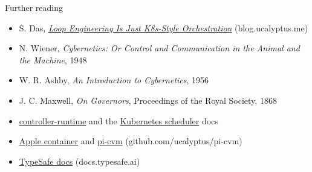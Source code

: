 \documentclass[aspectratio=169]{beamer}
\begin{document}
\begin{frame}{Further reading}
  \small
  \begin{itemize}
    \item S. Das, \href{https://blog.ucalyptus.me/p/loop-engineering-is-just-k8s-style}{\emph{Loop Engineering Is Just K8s-Style Orchestration}} (blog.ucalyptus.me)
    \item N. Wiener, \emph{Cybernetics: Or Control and Communication in the Animal and the Machine}, 1948
    \item W. R. Ashby, \emph{An Introduction to Cybernetics}, 1956
    \item J. C. Maxwell, \emph{On Governors}, Proceedings of the Royal Society, 1868
    \item \href{https://github.com/kubernetes-sigs/controller-runtime}{controller-runtime} and the \href{https://kubernetes.io/docs/concepts/scheduling-eviction/kube-scheduler/}{Kubernetes scheduler} docs
    \item \href{https://github.com/apple/container}{Apple container} and \href{https://github.com/ucalyptus/pi-cvm}{pi-cvm} (github.com/ucalyptus/pi-cvm)
    \item \href{https://docs.typesafe.ai}{TypeSafe docs} (docs.typesafe.ai)
  \end{itemize}
\end{frame}
\end{document}
